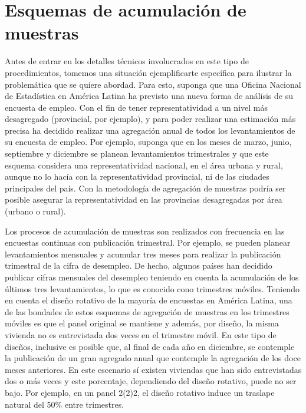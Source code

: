 \documentclass[
  10pt,
  spanish,
]{book}
\begin{document}
\hypertarget{esquemas-de-acumulaciuxf3n-de-muestras}{%
\section{Esquemas de acumulación de muestras}\label{esquemas-de-acumulaciuxf3n-de-muestras}}

Antes de entrar en los detalles técnicos involucrados en este tipo de
procedimientos, tomemos una situación ejemplificarte específica para
ilustrar la problemática que se quiere abordad. Para esto, suponga que
una Oficina Nacional de Estadística en América Latina ha previsto una
nueva forma de análisis de su encuesta de empleo. Con el fin de tener
representatividad a un nivel más desagregado (provincial, por ejemplo),
y para poder realizar una estimación más precisa ha decidido realizar
una agregación anual de todos los levantamientos de su encuesta de
empleo. Por ejemplo, suponga que en los meses de marzo, junio,
septiembre y diciembre se planean levantamientos trimestrales y que este
esquema considera una representatividad nacional, en el área urbana y
rural, aunque no lo hacía con la representatividad provincial, ni de las
ciudades principales del país. Con la metodología de agregación de
muestras podría ser posible asegurar la representatividad en las
provincias desagregadas por área (urbano o rural).

Los procesos de acumulación de muestras son realizados con frecuencia en
las encuestas continuas con publicación trimestral. Por ejemplo, se
pueden planear levantamientos mensuales y acumular tres meses para
realizar la publicación trimestral de la cifra de desempleo. De hecho,
algunos países han decidido publicar cifras mensuales del desempleo
teniendo en cuenta la acumulación de los últimos tres levantamientos, lo
que es conocido cono trimestres móviles. Teniendo en cuenta el diseño
rotativo de la mayoría de encuestas en América Latina, una de las
bondades de estos esquemas de agregación de muestras en los trimestres
móviles es que el panel original se mantiene y además, por diseño, la
misma vivienda no es entrevistada dos veces en el trimestre móvil. En
este tipo de diseños, inclusive es posible que, al final de cada año en
diciembre, se contemple la publicación de un gran agregado anual que
contemple la agregación de los doce meses anteriores. En este escenario
sí existen viviendas que han sido entrevistadas dos o más veces y este
porcentaje, dependiendo del diseño rotativo, puede no ser bajo. Por
ejemplo, en un panel 2(2)2, el diseño rotativo induce un traslape
natural del 50\% entre trimestres.
\end{document}
